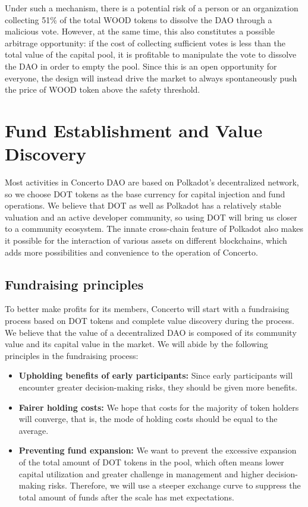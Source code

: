 \documentclass[UTF8]{article}
\begin{document}
\begin{multicols}{2}
Under such a mechanism, there is a potential risk of a person or an organization collecting 51\% of the total WOOD tokens to dissolve the DAO through a malicious vote. However, at the same time, this also constitutes a possible arbitrage opportunity: if the cost of collecting sufficient votes is less than the total value of the capital pool, it is profitable to manipulate the vote to dissolve the DAO in order to empty the pool. Since this is an open opportunity for everyone, the design will instead drive the market to always spontaneously push the price of WOOD token above the safety threshold.


\section{Fund Establishment and Value Discovery}


Most activities in Concerto DAO are based on Polkadot\cite{polkadot}’s decentralized network, so we choose DOT tokens as the base currency for capital injection and fund operations. We believe that DOT as well as Polkadot has a relatively stable valuation and an active developer community, so using DOT will bring us closer to a community ecosystem. The innate cross-chain feature of Polkadot also makes it possible for the interaction of various assets on different blockchains, which adds more possibilities and convenience to the operation of Concerto.

\subsection{Fundraising principles}

To better make profits for its members, Concerto will start with a fundraising process based on DOT tokens and complete value discovery during the process. We believe that the value of a decentralized DAO is composed of its community value and its capital value in the market. We will abide by the following principles in the fundraising process:

\begin{itemize}
\item \textbf{Upholding benefits of early participants: }
Since early participants will encounter greater decision-making risks, they should be given more benefits.
\item \textbf{Fairer holding costs: }
We hope that costs for the majority of token holders will converge, that is, the mode of holding costs should be equal to the average.
\item \textbf{Preventing fund expansion: }
We want to prevent the excessive expansion of the total amount of DOT tokens in the pool, which often means lower capital utilization and greater challenge in management and higher decision-making risks. Therefore, we will use a steeper exchange curve to suppress the total amount of funds after the scale has met expectations.
\end{itemize}


\end{multicols}
\end{document}
